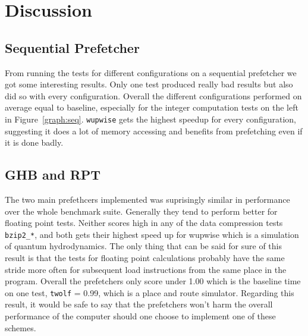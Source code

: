 \section{Discussion} %


\subsection{Sequential Prefetcher}

From running the tests for different configurations on a sequential
prefetcher we got some interesting results. Only one test produced
really bad results but also did so with every configuration. Overall
the different configurations performed on average equal to baseline,
especially for the integer computation tests on the left in
Figure~\ref{graph:seq}. \texttt{wupwise} gets the highest speedup for
every configuration, suggesting it does a lot of memory accessing and
benefits from prefetching even if it is done badly. 

\subsection{GHB and RPT}
The two main prefethcers implemented was suprisingly similar in
performance over the whole benchmark suite. Generally they tend to
perform better for floating point tests. Neither scores high in any of
the data compression tests \texttt{bzip2\_*}, and both gets their
highest speed up for wupwise which is a simulation of quantum
hydrodynamics. The only thing that can be said for sure of this result
is that the tests for floating point calculations probably have the
same stride more often for subsequent load instructions from the same
place in the program. Overall the prefetchers only score under 1.00
which is the baseline time on one test,  \texttt{twolf} = 0.99, which is a
place and route simulator. Regarding this result, it would be safe to
say that the prefetchers won't harm the overall performance of the
computer should one choose to implement one of these schemes. 
